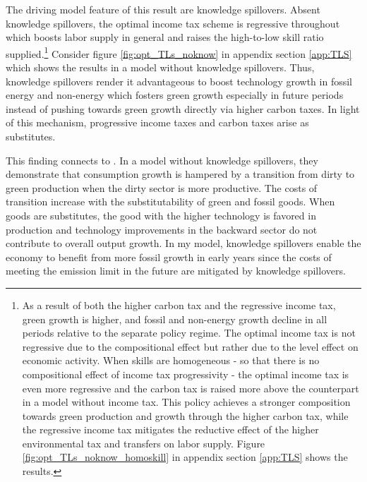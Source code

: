 \begin{figure}[h!!!]
\begin{minipage}[]{0.32\textwidth}
	\end{minipage}
\end{figure} 


The driving model feature of this result are knowledge spillovers. Absent knowledge spillovers, the optimal income tax scheme is regressive throughout which boosts labor supply in general and raises the high-to-low skill ratio supplied.\footnote{As a result of both the higher carbon tax and the regressive income tax, green growth is higher, and fossil and non-energy growth decline in all periods relative to the separate policy regime.  The optimal income tax is not regressive due to the compositional effect but rather due to the level effect on economic activity. When skills are homogeneous - so that there is no compositional effect of income tax progressivity - the optimal income tax is even more regressive and the carbon tax is raised more above the counterpart in a model without income tax. This policy achieves a stronger composition towards green production and growth through the higher carbon tax, while the regressive income tax mitigates the reductive effect of the higher environmental tax and transfers on labor supply. Figure \ref{fig:opt_TLs_noknow_homoskill} in appendix section \ref{app:TLS} shows the results.} Consider figure \ref{fig:opt_TLs_noknow} in appendix section \ref{app:TLS} which shows the results in a model without knowledge spillovers.
Thus, knowledge spillovers render it advantageous to boost technology growth in fossil energy and non-energy which fosters green growth especially in future periods instead of pushing towards green growth directly via higher carbon taxes. In light of this mechanism, progressive income taxes and carbon taxes arise as substitutes. 

This finding connects to \cite{Acemoglu2012TheChange}.  In a model without knowledge spillovers, they demonstrate that consumption growth is hampered by a transition from dirty to green production when the dirty sector is more productive. The costs of transition increase with the substitutability of green and fossil goods. When goods are substitutes, the good with the higher technology is favored in production and technology improvements in the backward sector do not contribute to overall output growth.
In my model, knowledge spillovers enable the economy to benefit from more fossil growth in early years since the costs of meeting the emission limit in the future are mitigated by knowledge spillovers. 

